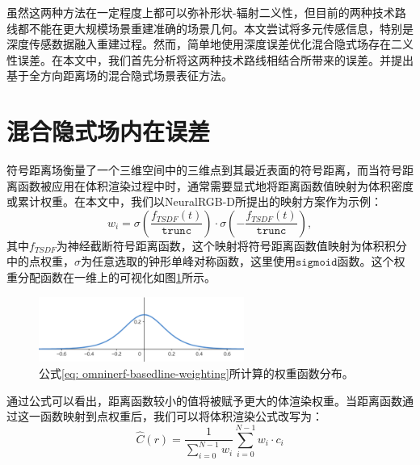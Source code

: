 虽然这两种方法在一定程度上都可以弥补形状-辐射二义性，但目前的两种技术路线都不能在更大规模场景重建准确的场景几何。本文尝试将多元传感信息，特别是深度传感数据融入重建过程。然而，简单地使用深度误差优化混合隐式场存在二义性误差。在本文中，我们首先分析将这两种技术路线相结合所带来的误差。并提出基于全方向距离场的混合隐式场景表征方法。

\section{混合隐式场内在误差}
符号距离场衡量了一个三维空间中的三维点到其最近表面的符号距离，而当符号距离函数被应用在体积渲染过程中时，通常需要显式地将距离函数值映射为体积密度或累计权重。在本文中，我们以NeuralRGB-D\cite{azinovic_neural_2022}所提出的映射方案作为示例：
\begin{equation}
    w_i = \sigma\left(\frac{f_{TSDF}(t)}{\mathtt{trunc}}\right)\cdot\sigma\left(-\frac{f_{TSDF}(t)}{\mathtt{trunc}}\right),
    \label{eq: omninerf-basedline-weighting}
\end{equation}
其中$f_{TSDF}$为神经截断符号距离函数，这个映射将符号距离函数值映射为体积积分中的点权重，$\sigma$为任意选取的钟形单峰对称函数，这里使用$\mathtt{sigmoid}$函数。这个权重分配函数在一维上的可视化如图\ref{fig:omninerf-baseline-weighting}所示。

\begin{figure}[h]
    \centering
    \includegraphics[width=0.6\textwidth]{undergraduate-thesis/images/neural-rgbd weighting function.png}
    \caption{公式\ref{eq: omninerf-basedline-weighting}所计算的权重函数分布。}
    \label{fig:omninerf-baseline-weighting}
\end{figure}

通过公式可以看出，距离函数较小的值将被赋予更大的体渲染权重。当距离函数通过这一函数映射到点权重后，我们可以将体积渲染公式改写为：
\begin{equation}
    \hat{C}(r) = \frac 1 {\sum_{i=0}^{N-1}w_i}\sum_{i=0}^{N-1}w_i\cdot c_i
\end{equation}


